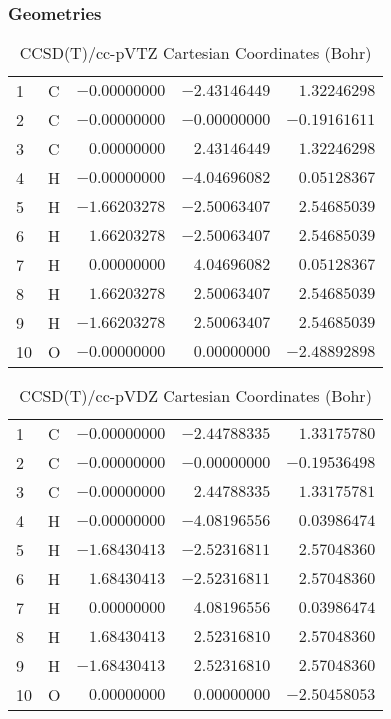 \documentclass[10pt,oneside]{article}
\begin{document}
\clearpage

\subsection{\ \ \ }

\subsubsection*{Geometries}
\begin{table}[h!]
\centering
\caption{CCSD(T)/cc-pVTZ Cartesian Coordinates (Bohr)}
\begin{tabular}{llrrr}
1  & C  & $-0.00000000$ & $-2.43146449$ & $ 1.32246298$ \\
2  & C  & $-0.00000000$ & $-0.00000000$ & $-0.19161611$ \\
3  & C  & $ 0.00000000$ & $ 2.43146449$ & $ 1.32246298$ \\
4  & H  & $-0.00000000$ & $-4.04696082$ & $ 0.05128367$ \\
5  & H  & $-1.66203278$ & $-2.50063407$ & $ 2.54685039$ \\
6  & H  & $ 1.66203278$ & $-2.50063407$ & $ 2.54685039$ \\
7  & H  & $ 0.00000000$ & $ 4.04696082$ & $ 0.05128367$ \\
8  & H  & $ 1.66203278$ & $ 2.50063407$ & $ 2.54685039$ \\
9  & H  & $-1.66203278$ & $ 2.50063407$ & $ 2.54685039$ \\
10 & O  & $-0.00000000$ & $ 0.00000000$ & $-2.48892898$ \\
\end{tabular}
\end{table}

\begin{table}[h!]
\centering
\caption{CCSD(T)/cc-pVDZ Cartesian Coordinates (Bohr)}
\begin{tabular}{llrrr}
1  & C  & $-0.00000000$ & $-2.44788335$ & $ 1.33175780$ \\
2  & C  & $-0.00000000$ & $-0.00000000$ & $-0.19536498$ \\
3  & C  & $-0.00000000$ & $ 2.44788335$ & $ 1.33175781$ \\
4  & H  & $-0.00000000$ & $-4.08196556$ & $ 0.03986474$ \\
5  & H  & $-1.68430413$ & $-2.52316811$ & $ 2.57048360$ \\
6  & H  & $ 1.68430413$ & $-2.52316811$ & $ 2.57048360$ \\
7  & H  & $ 0.00000000$ & $ 4.08196556$ & $ 0.03986474$ \\
8  & H  & $ 1.68430413$ & $ 2.52316810$ & $ 2.57048360$ \\
9  & H  & $-1.68430413$ & $ 2.52316810$ & $ 2.57048360$ \\
10 & O  & $ 0.00000000$ & $ 0.00000000$ & $-2.50458053$ \\
\end{tabular}
\end{table}
\end{document}
